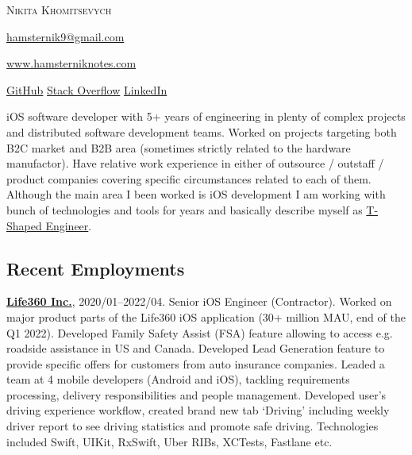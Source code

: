 \documentclass{nk-resume}
\begin{document}


\textsc{\huge{Nikita Khomitsevych}}

\vspace*{14px}

\href{mailto:hamsternik9@gmail.com}{hamsternik9@gmail.com} 

\href{https://hamsterniknotes.com}{www.hamsterniknotes.com}

\href{http://github.com/hamsternik}{\normalsize{GitHub}}
\hspace{2px}
\href{https://stackoverflow.com/users/3527499/hamsternik}{\normalsize{Stack Overflow}}
\hspace{2px}
\href{https://www.linkedin.com/in/khomitsevych/}{\normalsize{LinkedIn}} 

\vspace*{14px}

iOS software developer with 5+ years of engineering in plenty of complex projects and distributed 
software development teams. Worked on projects targeting both B2C market and B2B area (sometimes strictly 
related to the hardware manufactor). Have relative work experience in either of outsource / outstaff / product 
companies covering specific circumstances related to each of them. Although the main area I been worked is 
iOS development I am working with bunch of technologies and tools for years and basically describe myself 
as \href{https://alexkondov.com/the-t-shaped-engineer/}{T-Shaped Engineer}.


\subsection*{Recent Employments}

\textbf{\href{https://www.life360.com}{Life360 Inc.}}, 2020/01--2022/04. 
Senior iOS Engineer (Contractor).\newline
Worked on major product parts of the Life360 iOS application 
(30+ million MAU, end of the Q1 2022). Developed Family Safety Assist (FSA) feature allowing to access 
e.g. roadside assistance in US and Canada. Developed Lead Generation feature to provide specific offers 
for customers from auto insurance companies. Leaded a team at 4 mobile developers (Android and iOS), 
tackling requirements processing, delivery responsibilities and people management. Developed user's 
driving experience workflow, created brand new tab ‘Driving’ including weekly driver report 
to see driving statistics and promote safe driving.\newline
Technologies included Swift, UIKit, RxSwift, Uber RIBs, XCTests, Fastlane etc.
\end{document}
